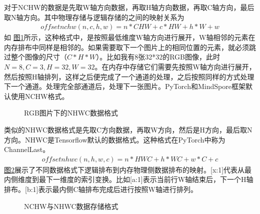 \documentclass[letterpaper,10pt,english]{sphinxmanual}
\let\sphinxpxdimen\pdfpxdimen\else\newdimen\sphinxpxdimen
\begin{document}
\sphinxAtStartPar
对于NCHW的数据是先取W轴方向数据，再取H轴方向数据，再取C轴方向，最后取N轴方向。其中物理存储与逻辑存储的之间的映射关系为
\begin{equation}\label{equation:chapter_backend_and_runtime/kernel_selecter:chapter_backend_and_runtime/kernel_selecter:0}
\begin{split}offsetnchw(n,c,h,w) = n*CHW + c*HW + h*W +w\end{split}
\end{equation}
\sphinxAtStartPar
如
\hyperref[\detokenize{chapter_backend_and_runtime/kernel_selecter:nchw}]{图\ref{\detokenize{chapter_backend_and_runtime/kernel_selecter:nchw}}}所示，这种格式中，是按照最低维度W轴方向进行展开，W轴相邻的元素在内存排布中同样是相邻的。如果需要取下一个图片上的相同位置的元素，就必须跳过整个图像的尺寸（\(C*H*W\)）。比如我有8张32*32的RGB图像，此时\(N=8,C=3,H=32,W=32\)。在内存中存储它们需要先按照W轴方向进行展开，然后按照H轴排列，这样之后便完成了一个通道的处理，之后按照同样的方式处理下一个通道。处理完全部通道后，处理下一张图片。PyTorch和MindSpore框架默认使用NCHW格式。

\begin{figure}[H]
\centering
\capstart

\noindent\sphinxincludegraphics[width=800\sphinxpxdimen]{{nchw}.png}
\caption{RGB图片下的NHWC数据格式}\label{\detokenize{chapter_backend_and_runtime/kernel_selecter:id6}}\label{\detokenize{chapter_backend_and_runtime/kernel_selecter:nchw}}\end{figure}

\sphinxAtStartPar
类似的NHWC数据格式是先取C方向数据，再取W方向，然后是H方向，最后取N方向。NHWC是Tensorflow默认的数据格式。这种格式在PyTorch中称为Channel\sphinxhyphen{}Last。
\begin{equation}\label{equation:chapter_backend_and_runtime/kernel_selecter:chapter_backend_and_runtime/kernel_selecter:1}
\begin{split}offsetnhwc(n,h,w,c) = n*HWC + h*WC + w*C +c\end{split}
\end{equation}
\sphinxAtStartPar
\hyperref[\detokenize{chapter_backend_and_runtime/kernel_selecter:nchwandnhwc}]{图\ref{\detokenize{chapter_backend_and_runtime/kernel_selecter:nchwandnhwc}}}展示了不同数据格式下逻辑排布到内存物理侧数据排布的映射。{[}x:1{]}代表从最内侧维度到最下一维度的索引变换。比如{[}a:1{]}表示当前行W轴结束后，下一个H轴排布。{[}b:1{]}表示最内侧C轴排布完成后进行按照W轴进行排列。

\begin{figure}[H]
\centering
\capstart

\noindent\sphinxincludegraphics[width=800\sphinxpxdimen]{{nchwandnhwc}.png}
\caption{NCHW与NHWC数据存储格式}\label{\detokenize{chapter_backend_and_runtime/kernel_selecter:id7}}\label{\detokenize{chapter_backend_and_runtime/kernel_selecter:nchwandnhwc}}\end{figure}
\end{document}
